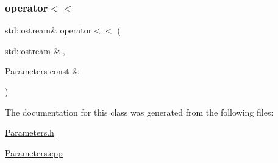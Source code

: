 \subsubsection{\texorpdfstring{operator$<$$<$}{operator<<}}
{\footnotesize\ttfamily std\+::ostream\& operator$<$$<$ (\begin{DoxyParamCaption}\item[{std\+::ostream \&}]{,  }\item[{\mbox{\hyperlink{class_parameters}{Parameters}} const \&}]{ }\end{DoxyParamCaption})\hspace{0.3cm}{\ttfamily [friend]}}



The documentation for this class was generated from the following files\+:\begin{DoxyCompactItemize}
\item 
\mbox{\hyperlink{_parameters_8h}{Parameters.\+h}}\item 
\mbox{\hyperlink{_parameters_8cpp}{Parameters.\+cpp}}\end{DoxyCompactItemize}
